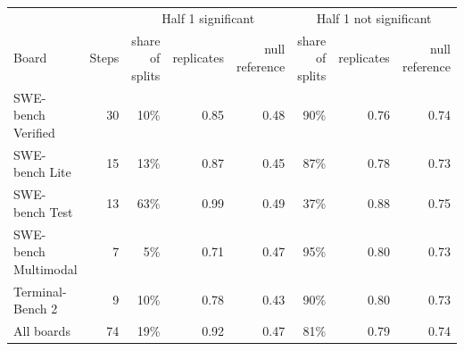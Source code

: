 \begin{tabular}{lrrrrrrr}
\toprule
 & & \multicolumn{3}{c}{Half 1 significant} & \multicolumn{3}{c}{Half 1 not significant} \\
Board & Steps & share of splits & replicates & null reference & share of splits & replicates & null reference \\
\midrule
SWE-bench Verified & 30 & 10\% & 0.85 & 0.48 & 90\% & 0.76 & 0.74 \\
SWE-bench Lite & 15 & 13\% & 0.87 & 0.45 & 87\% & 0.78 & 0.73 \\
SWE-bench Test & 13 & 63\% & 0.99 & 0.49 & 37\% & 0.88 & 0.75 \\
SWE-bench Multimodal & 7 & 5\% & 0.71 & 0.47 & 95\% & 0.80 & 0.73 \\
Terminal-Bench 2 & 9 & 10\% & 0.78 & 0.43 & 90\% & 0.80 & 0.73 \\
All boards & 74 & 19\% & 0.92 & 0.47 & 81\% & 0.79 & 0.74 \\
\bottomrule
\end{tabular}
